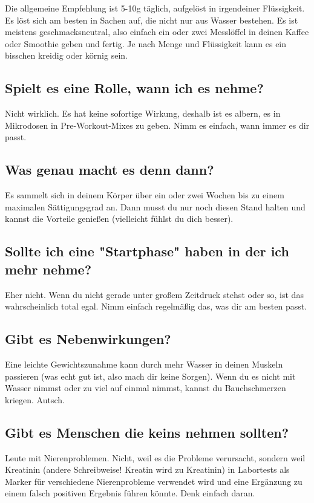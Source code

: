 \documentclass{article}
\begin{document}
Die allgemeine Empfehlung ist 5-10g täglich, aufgelöst in irgendeiner Flüssigkeit. Es löst sich am besten in Sachen auf, die nicht nur aus Wasser bestehen. Es ist meistens geschmacksneutral, also einfach ein oder zwei Messlöffel in deinen Kaffee oder Smoothie geben und fertig. Je nach Menge und Flüssigkeit kann es ein bisschen kreidig oder körnig sein.

\subsection{Spielt es eine Rolle, wann ich es nehme?}

Nicht wirklich. Es hat keine sofortige Wirkung, deshalb ist es albern, es in Mikrodosen in Pre-Workout-Mixes zu geben. Nimm es einfach, wann immer es dir passt.

\subsection{Was genau macht es denn dann?}

Es sammelt sich in deinem Körper über ein oder zwei Wochen bis zu einem maximalen Sättigungsgrad an. Dann musst du nur noch diesen Stand halten und kannst die Vorteile genießen (vielleicht fühlst du dich besser).

\subsection{Sollte ich eine "Startphase" haben in der ich mehr nehme?}

Eher nicht. Wenn du nicht gerade unter großem Zeitdruck stehst oder so, ist das wahrscheinlich total egal. Nimm einfach regelmäßig das, was dir am besten passt.

\subsection{Gibt es Nebenwirkungen?}

Eine leichte Gewichtszunahme kann durch mehr Wasser in deinen Muskeln passieren (was echt gut ist, also mach dir keine Sorgen). Wenn du es nicht mit Wasser nimmst oder zu viel auf einmal nimmst, kannst du Bauchschmerzen kriegen. Autsch.

\subsection{Gibt es Menschen die keins nehmen sollten?}

Leute mit Nierenproblemen. Nicht, weil es die Probleme verursacht, sondern weil Kreatinin (andere Schreibweise! Kreatin wird zu Kreatinin) in Labortests als Marker für verschiedene Nierenprobleme verwendet wird und eine Ergänzung zu einem falsch positiven Ergebnis führen könnte. Denk einfach daran.
\end{document}
